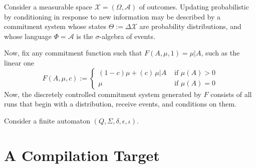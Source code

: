 \documentclass{article}
\begin{document}
    
    
    \begin{example}
        Consider a measurable space $\mathcal X = (\Omega, \mathcal A)$ of outcomes.
        Updating probabilistic by conditioning in response to new information may be described by a commitment system whose states $\Theta := \Delta \mathcal X$ are probability distributions, and whose language $\Phi = \mathcal A$ is the $\sigma$-algebra of events. 
        
        Now, fix any commitment function such that $F(A,\mu,1) = \mu | A$, such as the linear one 
        \[ 
            F(A, \mu, c) := 
             \begin{cases}
                (1-c) \mu + (c)\, \mu | A & \text{~if~} \mu(A) > 0 \\
                \mu & \text{~if~} \mu(A)=0
            \end{cases}
        \]
        Now, the discretely controlled commitment system generated by $F$ consists of all runs that begin with a distribution, receive events, and conditions on them. 
    \end{example}
    
    \begin{example}
        Consider a finite automaton $(Q, \Sigma, \delta, \epsilon, \iota)$.
    \end{example}


    
    
    \section{A Compilation Target}
    
\end{document}
